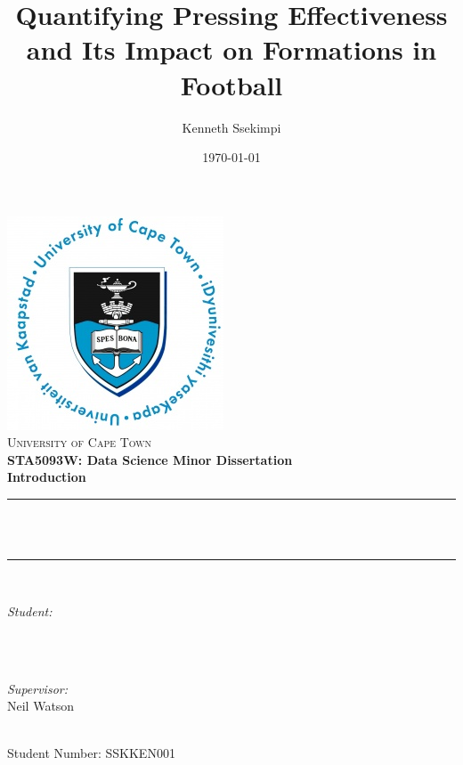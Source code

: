\documentclass[12pt]{article}
\title{Quantifying Pressing Effectiveness and Its Impact on Formations in Football}
\author{Kenneth Ssekimpi}
\date{\today}
\makeatletter
\let\thetitle\@title
\let\theauthor\@author
\makeatother
\begin{document}

\begin{titlepage}
        \centering
    \vspace*{0.5 cm}
    \includegraphics[scale = 0.75]{UCT Logo.jpg}\\[1.0 cm]
    \textsc{\LARGE University of Cape Town}\\[0.5 cm]	%
    \textbf{\Large STA5093W: Data Science Minor Dissertation}\\[0.5 cm]				%
	\textbf{\large Introduction}\\[0.5 cm]				%
	\rule{\linewidth}{0.2 mm} \\[0.4 cm]
	{ \huge \bfseries \thetitle}\\
	\rule{\linewidth}{0.2 mm} \\[1.5 cm]
	
	\begin{minipage}{0.4\textwidth}
		\begin{flushleft} \large
			\emph{Student:}\\
			\theauthor \\
			\end{flushleft}
			\end{minipage}~
			\begin{minipage}{0.4\textwidth}
			\begin{flushright} \large
			\emph{Supervisor:} \\
			Neil Watson									
		\end{flushright}
	\end{minipage}\\[2 cm]

Student Number: SSKKEN001 \\

	
\end{titlepage}
\end{document}
